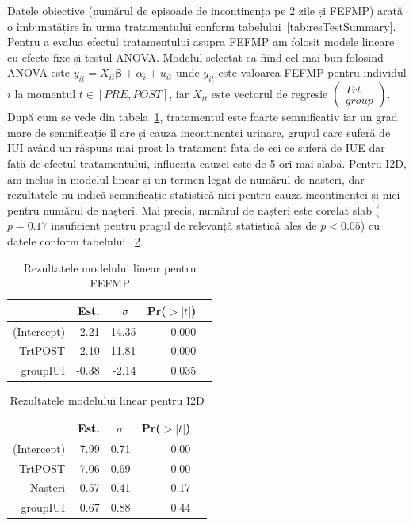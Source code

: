 \documentclass[12pt,draft]{article}
\begin{document}
  Datele obiective (numărul de episoade de incontinența pe 2 zile și \ac{FEFMP}) arată o îmbunatățire în urma tratamentului conform tabelului~\ref{tab:resTestSummary}. Pentru a evalua efectul tratamentului asupra \ac{FEFMP} am folosit modele lineare cu efecte fixe și testul ANOVA. Modelul selectat ca fiind cel mai bun folosind ANOVA este $y_{it} = X_{it}\mathbf{\beta}+\alpha_{i}+u_{it}$ unde $y_{it}$ este valoarea FEFMP pentru individul $i$ la momentul $t \in [PRE,POST]$, iar $X_{it}$ este vectorul de regresie $\left(\!\begin{array}{c}Trt\\group\end{array}\right)$. După cum se vede din tabela~\ref{tab:resFEFMPlm}, tratamentul este foarte semnificativ iar un grad mare de semnificație îl are și cauza incontinentei urinare, grupul care suferă de \ac{IUI} având un răspuns mai prost la tratament fata de cei ce suferă de \ac{IUE} dar față de efectul tratamentului, influența cauzei este de 5 ori mai slabă.
  Pentru I2D, am inclus în modelul linear și un termen legat de numărul de nașteri, dar rezultatele nu indică semnificație statistică nici pentru cauza incontinenței și nici pentru numărul de nașteri. Mai precis, numărul de nașteri este corelat slab ($p=0.17$ insuficient pentru pragul de  relevanță statistică ales de $p<0.05$) cu datele conform tabelului~ \ref{tab:resI2Dlm}.
  \begin{table}[H]
		\centering
		\begin{tabular}{rrrrr}
			\hline
			& Est. & $\sigma~~~$ & Pr($>|t|$) \\ \hline
			(Intercept) & 2.21 & 14.35 & 0.000 \\ 
			TrtPOST & 2.10  & 11.81 & 0.000 \\ 
			groupIUI & -0.38 & -2.14 & 0.035 \\ \hline
		\end{tabular}
		\caption{Rezultatele modelului linear pentru FEFMP} 
		\label{tab:resFEFMPlm}
	\end{table}
  
	\begin{table}[H]
		\centering
		\begin{tabular}{rrrrr}
			\hline
			& Est. & $\sigma~~~$ & Pr($>|t|$) \\ \hline
			(Intercept) & 7.99 & 0.71 & 0.00 \\ 
			TrtPOST & -7.06 & 0.69 & 0.00 \\ 
			Nașteri & 0.57 & 0.41 & 0.17 \\
			groupIUI & 0.67 & 0.88 & 0.44 \\ \hline
		\end{tabular}
		\caption{Rezultatele modelului linear pentru I2D} 
		\label{tab:resI2Dlm}
	\end{table}
\end{document}
